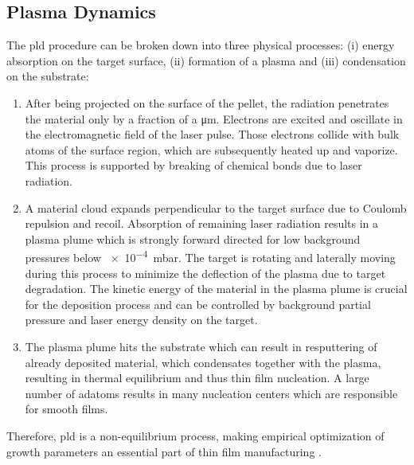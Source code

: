 \subsection{Plasma Dynamics}
The \gls{pld} procedure can be broken down into three physical processes: (i) energy absorption on the target surface, (ii) formation of a plasma and (iii) condensation on the substrate:
\begin{enumerate}[label=(\roman*)]
    \item After being projected on the surface of the pellet, the radiation penetrates the material only by a fraction of a \unit{\um}.
    Electrons are excited and oscillate in the electromagnetic field of the laser pulse.
    Those electrons collide with bulk atoms of the surface region, which are subsequently heated up and vaporize.
    This process is supported by breaking of chemical bonds due to laser radiation.
    \item A material cloud expands perpendicular to the target surface due to Coulomb repulsion and recoil.
    Absorption of remaining laser radiation results in a plasma plume which is strongly forward directed for low background pressures below \qty{e-4}{\milli\bar}.
    The target is rotating and laterally moving during this process to minimize the deflection of the plasma due to target degradation.
    The kinetic energy of the material in the plasma plume is crucial for the deposition process and can be controlled by background partial pressure and laser energy density on the target.
    \item The plasma plume hits the substrate which can result in resputtering of already deposited material, which condensates together with the plasma, resulting in thermal equilibrium and thus thin film nucleation.
    A large number of adatoms results in many nucleation centers which are responsible for smooth films.
\end{enumerate}
Therefore, \gls{pld} is a non-equilibrium process, making empirical optimization of growth parameters an essential part of thin film manufacturing
    \cite{lorenz2019}.

